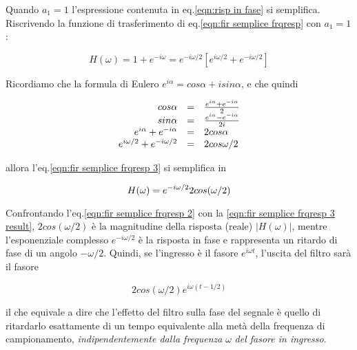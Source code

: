Quando $a_1 = 1$ l'espressione contenuta in eq.\ref{eqn:risp in fase} si
semplifica. Riscrivendo la funzione di trasferimento di eq.\ref{eqn:fir semplice frqresp}
con $a_1 = 1$:

	\begin{equation}\label{eqn:fir semplice frqresp 3}
			H ( \omega ) = 1 + e^{-i \omega} = e^{-i \omega / 2} \left [ e^{i \omega / 2} + e^{-i \omega / 2} \right ]
	\end{equation}

Ricordiamo che la formula di Eulero $e^{i \alpha} = cos \alpha + i sin
\alpha$, e che quindi

	\begin{equation}\label{eqn:remember eulero}
			\begin{array}{r c l}
							cos \alpha & = & \frac{e^{i \alpha} + e^{-i \alpha}}{2}\\
							sin \alpha & = & \frac{e^{i \alpha} - e^{-i \alpha}}{2i}\\
							e^{i \alpha} + e^{-i \alpha} & = & 2 cos \alpha\\
							e^{i \omega / 2 } + e^{-i \omega / 2} & = & 2 cos \omega / 2\\
			\end{array}
	\end{equation}

	allora l'eq.\ref{eqn:fir semplice frqresp 3} si semplifica in

  \begin{equation}\label{eqn:fir semplice frqresp 3 result}
		H (\omega) =  e^{-i \omega / 2} 2 cos (\omega / 2)\\
	\end{equation}

Confrontando l'eq.\ref{eqn:fir semplice frqresp 2} con la \ref{eqn:fir semplice frqresp 3 result},
$2 cos (\omega / 2)$ \`e la magnitudine della risposta (reale) $|H ( \omega )|$,
mentre l'esponenziale complesso $e^{-i \omega / 2}$ \`e la risposta in fase
e rappresenta un ritardo di fase di un angolo $- \omega / 2$.
Quindi, se l'ingresso \`e il fasore $e^{i \omega t}$, l'uscita del filtro
sar\`a il fasore

	\begin{equation}\label{eqn:fir output}
			2 cos ( \omega / 2 ) e^{i \omega (t - 1 / 2)}
	\end{equation}

il che equivale a dire che l'effetto del filtro sulla fase del segnale \`e
quello di ritardarlo esattamente di un tempo equivalente alla met\`a della
frequenza di campionamento, \emph{indipendentemente dalla frequenza} $\omega$
\emph{del fasore in ingresso}.

